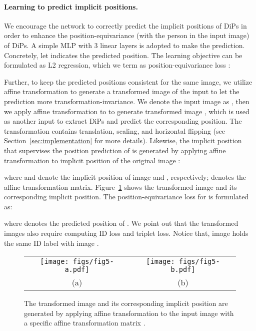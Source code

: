 \documentclass[10pt,twocolumn,letterpaper]{article}
\begin{document}
\vspace{-0.4cm}
\paragraph{Learning to predict implicit positions.} 
We encourage the network to correctly predict the implicit positions of DiPs in order to enhance the position-equivariance (with the person in the input image) of DiPs.
A simple MLP with 3 linear layers is adopted to make the prediction. 
Concretely, let  indicates the predicted position. The learning objective can be formulated as L2 regression, which we term as position-equivariance loss :


Further, to keep the predicted positions consistent for the same image, we utilize affine transformation to generate a transformed image of the input to let the prediction more transformation-invariance. We denote the input image as , then we apply affine transformation to  to generate transformed image , which is used as another input to extract DiPs and predict the corresponding position. The transformation contains translation, scaling, and horizontal flipping (see Section~\ref{sec:implementation} for more details). Likewise, the implicit position that supervises the position prediction of  is generated by applying affine transformation to implicit position  of the original image :

where  and  denote the implicit position of image  and , respectively;  denotes the affine transformation matrix. Figure~\ref{fig:affine_transformation} shows the transformed image and its corresponding implicit position. The position-equivariance loss for  is formulated as:

where  denotes the predicted position of . We point out that the transformed images also require computing ID loss and triplet loss. Notice that, image  holds the same ID label with image .

\begin{figure}
\setlength{\abovecaptionskip}{-0.2cm}
\begin{center}
\begin{tabular}{cc}
    \texttt{[image: figs/fig5-a.pdf]} & 
    \texttt{[image: figs/fig5-b.pdf]} \\
    (a) & (b)
\end{tabular}
\end{center}
\caption{The transformed image and its corresponding implicit position are generated by applying affine transformation to the input image with a specific affine transformation matrix .}
\label{fig:affine_transformation}
\end{figure}
\end{document}
